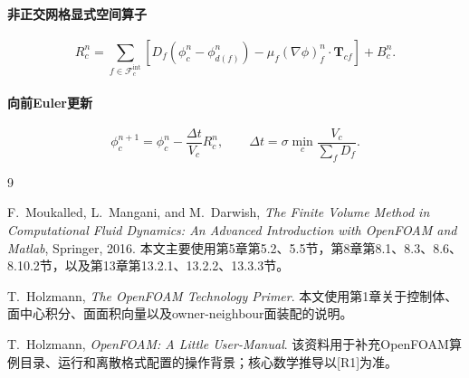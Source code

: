 \documentclass[UTF8,12pt,a4paper]{ctexart}
\numberwithin{equation}{section}
\newcommand{\Rone}{\textnormal{[R1]}}
\newcommand{\Tf}{\bm T}
\begin{document}
\paragraph{非正交网格显式空间算子}
\begin{equation}
  \boxed{
  R_c^n
  =\sum_{f\in\mathcal F_c^{\mathrm{int}}}\left[
  D_f(\phi_c^n-\phi_{d(f)}^n)
  -\mu_f(\nabla\phi)_f^n\cdot\Tf_{cf}
  \right]+B_c^n}.
  \label{eq:summary_space}
\end{equation}

\paragraph{向前Euler更新}
\begin{equation}
  \boxed{
  \phi_c^{n+1}
  =\phi_c^n-\frac{\Delta t}{V_c}R_c^n,
  \qquad
  \Delta t
  =\sigma\min_c\frac{V_c}{\sum_fD_f}}.
  \label{eq:summary_update}
\end{equation}

\newpage
\begin{thebibliography}{9}

F.~Moukalled, L.~Mangani, and M.~Darwish,
\textit{The Finite Volume Method in Computational Fluid Dynamics: An Advanced Introduction with OpenFOAM and Matlab},
Springer, 2016.
本文主要使用第5章第5.2、5.5节，第8章第8.1、8.3、8.6、8.10.2节，以及第13章第13.2.1、13.2.2、13.3.3节。

T.~Holzmann,
\textit{The OpenFOAM Technology Primer}.
本文使用第1章关于控制体、面中心积分、面面积向量以及owner-neighbour面装配的说明。

T.~Holzmann,
\textit{OpenFOAM: A Little User-Manual}.
该资料用于补充OpenFOAM算例目录、运行和离散格式配置的操作背景；核心数学推导以\Rone 为准。

\end{thebibliography}
\end{document}
